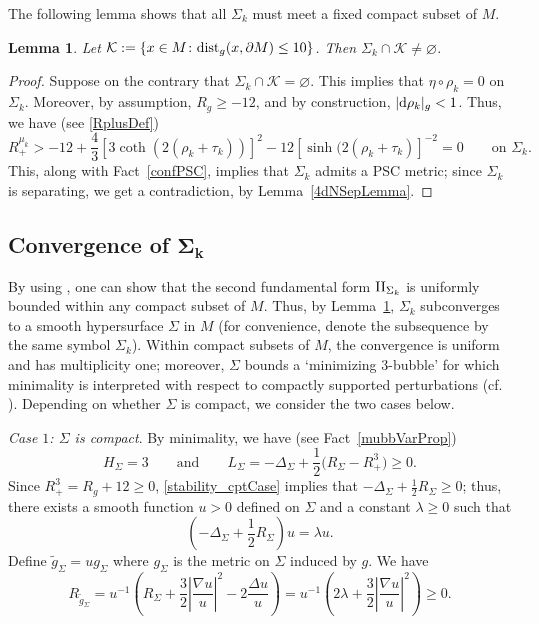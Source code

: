\documentclass[10pt,a4paper]{amsart}
\numberwithin{equation}{section}
\newtheorem{Lemma}[Theorem]{Lemma}
\def\II{{\rm II}}
\def\Kcal{\mathcal{K}}
\def\ed{{\rm d}}
\def\dist{{\rm dist}}
\begin{document}
The following lemma shows that all $\Sigma_k$ must meet a
fixed compact subset of $M$.

\begin{Lemma}\label{intersectionLemma}
	Let $\Kcal:= \{x\in M\colon \dist_g(x,\partial M)\le 10\}$.
	Then $\Sigma_k\cap \Kcal\ne \varnothing$.
\end{Lemma}
\begin{proof}
Suppose on the contrary that $\Sigma_{k}\cap \Kcal = \varnothing$. This implies that
$\eta\circ\rho_k = 0$ on $\Sigma_k$.
Moreover, by assumption, $R_g\ge -12$, and by construction, $|\ed\rho_k|_g < 1$. Thus, we have (see \eqref{RplusDef})
\[
R_{+}^{\mu_{k}}> -12+\frac{4}{3}[3\coth(2(\rho_{k}+\tau_k))]^{2}-12[\sinh(2(\rho_{k}+\tau_k)]^{-2}=0\qquad  \text{on }  \Sigma_k.
\]
This, along with Fact~\ref{confPSC}, implies that $\Sigma_k$ admits a PSC metric;
since $\Sigma_k$ is separating, we get a contradiction, by Lemma~\ref{4dNSepLemma}.
\end{proof}



\subsection[Convergence of Sigma\_{}k]{Convergence of $\boldsymbol{\Sigma_k}$}
\label{Sigmak_limits}
By using \cite[Theorem 3.6]{ZZ20}, one can show that the
 second fundamental form $\II_{\Sigma_k}$
is uniformly bounded within any compact subset of $M$.
Thus, by Lemma~\ref{intersectionLemma}, $\Sigma_k$ subconverges to a smooth hypersurface $\Sigma$ in $M$ (for convenience, denote the subsequence by the same symbol $\Sigma_k$). Within
compact subsets of $M$, the convergence is uniform and has multiplicity one;
moreover, $\Sigma$ bounds a `minimizing $3$-bubble' for which minimality is interpreted
with respect to compactly supported
perturbations {(cf. \cite[Lemma 4.10]{HLS22})}. Depending on whether $\Sigma$ is compact, we consider the
two cases below.

\emph{Case $1$: $\Sigma$ is compact}. By minimality, we have (see Fact~\ref{mubbVarProp})
\begin{equation}\label{stability_cptCase}
	H_{\Sigma}=3\qquad
	\mbox{and}\qquad L_{\Sigma}=-\Delta_{\Sigma}+\frac{1}{2}\big(R_{\Sigma}-R_{+}^{3}\big)\geq 0.
\end{equation}
Since $R_{+}^{3}=R_{g}+12\geq 0$, \eqref{stability_cptCase} implies that
$-\Delta_{\Sigma}+\frac{1}{2}R_{\Sigma}\ge 0$; thus, there exists
a smooth function $u>0$ defined on $\Sigma$ and a constant $\lambda\ge0$
such that
\begin{equation}\label{eigenfcn}
	\left(-\Delta_{\Sigma}+\frac{1}{2}R_{\Sigma}\right)u=\lambda u.
\end{equation}	
Define $\tilde{g}_{\Sigma}=ug_{\Sigma}$ where
$g_\Sigma$ is the metric on $\Sigma$ induced by $g$. We have
\begin{equation}\label{tildegScal}
R_{\tilde{g}_{\Sigma}}=u^{-1}\left(R_{{\Sigma}}+\frac{3}{2}\left|\frac{\nabla u}{u}\right|^{2}-2\frac{\Delta u}{u}\right)=u^{-1}\left(2\lambda+\frac{3}{2}\left|\frac{\nabla u}{u}\right|^{2}\right)\geq 0.
\end{equation}
\end{document}
